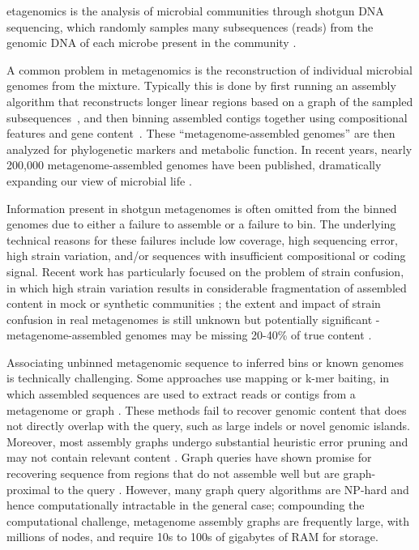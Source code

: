 etagenomics is the analysis of microbial communities through shotgun
DNA sequencing, which randomly samples many subsequences (reads)
from the genomic DNA of each microbe present in the community \cite{Quince2017}.

A common problem in metagenomics is the reconstruction of
individual microbial genomes from the mixture.
Typically this is
done by first running an assembly algorithm that reconstructs
longer linear regions based on a graph of the sampled
subsequences~\cite{pell2012scaling}, and then binning assembled
contigs together using compositional features and gene content~\cite{laczny2017busybee,lin2016accurate}.  These
``metagenome-assembled genomes'' are then
analyzed for phylogenetic markers and metabolic function. In recent years,
nearly 200,000 metagenome-assembled genomes have been published,
dramatically expanding our view of microbial life
\cite{Parks2017,Tully2018,Stewart2018,Delmont2018,Hug2016,Pasolli2019}.

Information present in shotgun metagenomes is often omitted from the
binned genomes due to either a failure to
assemble \cite{CAMI,Awad155358} or a failure to bin.  The underlying
technical reasons for these failures include low coverage, high
sequencing error, high strain variation, and/or sequences with
insufficient compositional or coding signal.  Recent work has
particularly focused on the problem of strain confusion, in which high
strain variation results in considerable fragmentation of assembled
content in mock or synthetic communities \cite{CAMI,Awad155358}; the
extent and impact of strain confusion in real metagenomes is still
unknown but potentially significant - metagenome-assembled genomes may be missing 20-40\% of true content \cite{brownstrain,Brito2016,baltic}.

Associating unbinned metagenomic sequence to inferred bins or known
genomes is technically challenging.  Some approaches use mapping or
k-mer baiting, in which assembled sequences are used to extract reads
or contigs from a metagenome or
graph \cite{desman,Nayfach2016,ekg,mspminer,Petersen2016}.
These
methods fail to recover genomic content that does not directly overlap
with the query, such as large indels or novel genomic
islands. Moreover, most assembly graphs undergo substantial heuristic
error pruning and may not contain relevant content
\cite{CAMI,Awad155358}.
Graph queries have shown promise for recovering sequence from regions that do
not assemble well but are graph-proximal to the query \cite{metacherchant,perchlorate}. However, many graph query
algorithms are NP-hard and hence computationally intractable in the
general case; compounding the computational challenge, metagenome assembly
graphs are frequently large, with millions of nodes, and require 10s
to 100s of gigabytes of RAM for storage.

